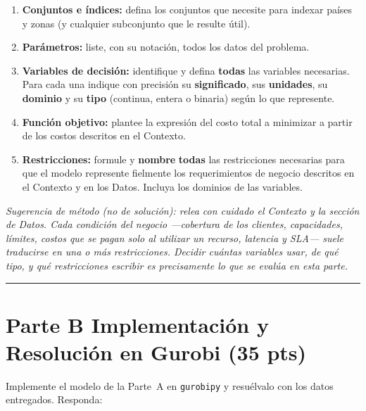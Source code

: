 \documentclass[12pt,a4paper]{article}
\begin{document}
\begin{enumerate}[label=\alph*), leftmargin=*, topsep=2pt]
    \item \textbf{Conjuntos e índices:} defina los conjuntos que necesite para
          indexar países y zonas (y cualquier subconjunto que le resulte útil).
    \item \textbf{Parámetros:} liste, con su notación, todos los datos del
          problema.
    \item \textbf{Variables de decisión:} identifique y defina \textbf{todas}
          las variables necesarias. Para cada una indique con precisión su
          \textbf{significado}, sus \textbf{unidades}, su \textbf{dominio} y su
          \textbf{tipo} (continua, entera o binaria) según lo que represente.
    \item \textbf{Función objetivo:} plantee la expresión del costo total a
          minimizar a partir de los costos descritos en el Contexto.
    \item \textbf{Restricciones:} formule y \textbf{nombre} \textbf{todas} las
          restricciones necesarias para que el modelo represente fielmente los
          requerimientos de negocio descritos en el Contexto y en los Datos.
          Incluya los dominios de las variables.
\end{enumerate}

\noindent\textit{Sugerencia de método (no de solución): relea con cuidado el
Contexto y la sección de Datos. Cada condición del negocio —cobertura de los
clientes, capacidades, límites, costos que se pagan solo al utilizar un recurso,
latencia y SLA— suele traducirse en una o más restricciones. Decidir cuántas
variables usar, de qué tipo, y qué restricciones escribir es precisamente lo que
se evalúa en esta parte.}

\noindent\rule{\linewidth}{0.4pt}

\section*{Parte B \quad Implementación y Resolución en Gurobi \hfill\normalfont\normalsize(35 pts)}

Implemente el modelo de la Parte~A en \texttt{gurobipy} y resuélvalo con los
datos entregados. Responda:
\end{document}
